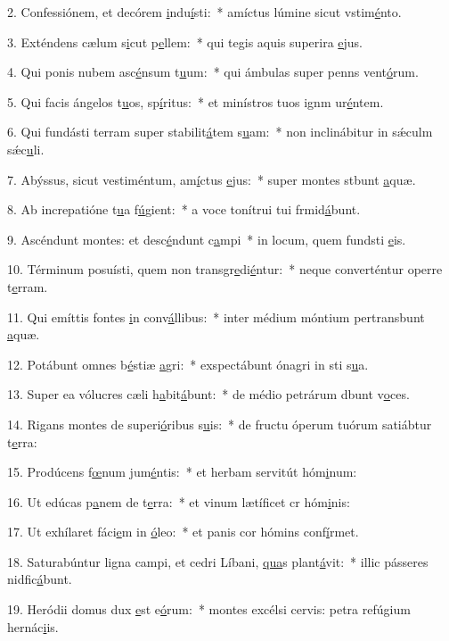 2. Confessiónem, et decórem \uline{i}ndu\uline{í}sti:~* amíctus lúmine sicut vstim\uline{é}nto.\par 
3. Exténdens cælum s\uline{i}cut p\uline{e}llem:~* qui tegis aquis superira \uline{e}jus.\par 
4. Qui ponis nubem asc\uline{é}nsum t\uline{u}um:~* qui ámbulas super penns vent\uline{ó}rum.\par 
5. Qui facis ángelos t\uline{u}os, sp\uline{í}ritus:~* et minístros tuos ignm ur\uline{é}ntem.\par 
6. Qui fundásti terram super stabilit\uline{á}tem s\uline{u}am:~* non inclinábitur in sǽculm sǽc\uline{u}li.\par 
7. Abýssus, sicut vestiméntum, am\uline{í}ctus \uline{e}jus:~* super montes stbunt \uline{a}quæ.\par 
8. Ab increpatióne t\uline{u}a f\uline{ú}gient:~* a voce tonítrui tui frmid\uline{á}bunt.\par 
9. Ascéndunt montes: et desc\uline{é}ndunt c\uline{a}mpi~* in locum, quem fundsti \uline{e}is.\par 
10. Términum posuísti, quem non transgr\uline{e}di\uline{é}ntur:~* neque converténtur operre t\uline{e}rram.\par 
11. Qui emíttis fontes \uline{i}n conv\uline{á}llibus:~* inter médium móntium pertransbunt \uline{a}quæ.\par 
12. Potábunt omnes b\uline{é}stiæ \uline{a}gri:~* exspectábunt ónagri in sti s\uline{u}a.\par 
13. Super ea vólucres cæli h\uline{a}bit\uline{á}bunt:~* de médio petrárum dbunt v\uline{o}ces.\par 
14. Rigans montes de superi\uline{ó}ribus s\uline{u}is:~* de fructu óperum tuórum satiábtur t\uline{e}rra:\par 
15. Prodúcens f\uline{œ}num jum\uline{é}ntis:~* et herbam servitút hóm\uline{i}num:\par 
16. Ut edúcas p\uline{a}nem de t\uline{e}rra:~* et vinum lætíficet cr hóm\uline{i}nis:\par 
17. Ut exhílaret fáci\uline{e}m in \uline{ó}leo:~* et panis cor hómins conf\uline{í}rmet.\par 
18. Saturabúntur ligna campi, et cedri Líbani, \uline{qua}s plant\uline{á}vit:~* illic pásseres nidfic\uline{á}bunt.\par 
19. Heródii domus dux \uline{e}st e\uline{ó}rum:~* montes excélsi cervis: petra refúgium hernác\uline{i}is.\par 
